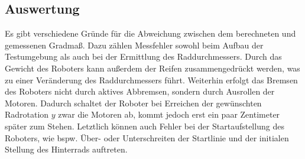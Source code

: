 \documentclass[ngerman]{tudscrreprt}
\begin{document}
\subsection{Auswertung}
Es gibt verschiedene Gründe für die Abweichung zwischen dem berechneten und gemessenen Gradmaß. Dazu zählen Messfehler sowohl beim Aufbau der Testumgebung als auch bei der Ermittlung des Raddurchmessers. Durch das Gewicht des Roboters kann außerdem der Reifen zusammengedrückt werden, was zu einer Veränderung des Raddurchmessers führt. Weiterhin erfolgt das Bremsen des Roboters nicht durch aktives Abbremsen, sondern durch Ausrollen der Motoren. Dadurch schaltet der Roboter bei Erreichen der gewünschten Radrotation $y$ zwar die Motoren ab, kommt jedoch erst ein paar Zentimeter später zum Stehen. Letztlich können auch Fehler bei der Startaufstellung des Roboters, wie bspw. Über- oder Unterschreiten der Startlinie und der initialen Stellung des Hinterrads auftreten.
\end{document}

